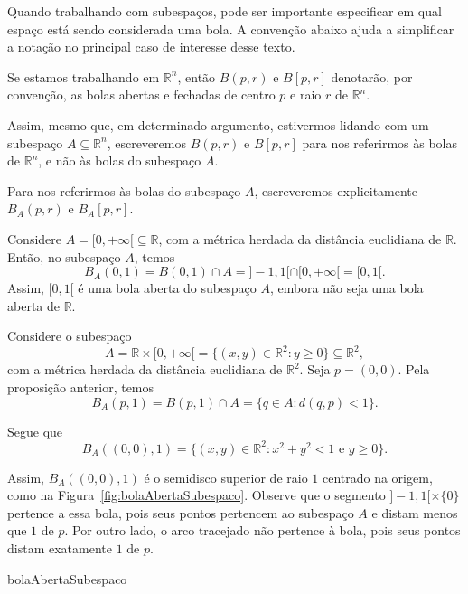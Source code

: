 Quando trabalhando com subespaços, pode ser importante especificar em qual espaço está sendo considerada uma bola.
A convenção abaixo ajuda a simplificar a notação no principal caso de interesse desse texto.

\begin{convention}
    Se estamos trabalhando em $\mathbb R^n$, então $B(p,r)$ e $B[p,r]$ denotarão, por convenção, as bolas abertas e fechadas de centro $p$ e raio $r$ de $\mathbb R^n$.

    Assim, mesmo que, em determinado argumento, estivermos lidando com um subespaço $A\subseteq \mathbb R^n$, escreveremos $B(p,r)$ e $B[p,r]$ para nos referirmos às bolas de $\mathbb R^n$, e não às bolas do subespaço $A$.

    Para nos referirmos às bolas do subespaço $A$, escreveremos explicitamente $B_A(p,r)$ e $B_A[p,r]$.
\end{convention}

\begin{example}
    Considere $A=[0,+\infty[\subseteq\mathbb R$, com a métrica herdada da distância euclidiana de $\mathbb R$.
    Então, no subespaço $A$, temos
    \[
        B_A(0,1)
        =
        B(0,1)\cap A
        =
        ]-1,1[\cap [0,+\infty[
        =
        [0,1[.
    \]
    Assim, $[0,1[$ é uma bola aberta do subespaço $A$, embora não seja uma bola aberta de $\mathbb R$.
\end{example}

\begin{example}
    Considere o subespaço
    \[
        A=\mathbb R\times [0,+\infty[=\{(x,y)\in\mathbb R^2:y\geq 0\}\subseteq\mathbb R^2,
    \]
    com a métrica herdada da distância euclidiana de $\mathbb R^2$.
    Seja $p=(0,0)$.
    Pela proposição anterior, temos
    \[
        B_A(p,1)=B(p,1)\cap A=\{q\in A: d(q, p)<1\}.
    \]

    Segue que
    \[
        B_A((0,0),1)
        =
        \{(x,y)\in\mathbb R^2:x^2+y^2<1 \text{ e } y\geq 0\}.
    \]
    
    Assim, $B_A((0,0),1)$ é o semidisco superior de raio $1$ centrado na origem, como na Figura~\ref{fig:bolaAbertaSubespaco}.
    Observe que o segmento $]-1,1[\times\{0\}$ pertence a essa bola, pois seus pontos pertencem ao subespaço $A$ e distam menos que $1$ de $p$.
    Por outro lado, o arco tracejado não pertence à bola, pois seus pontos distam exatamente $1$ de $p$.
\end{example}
{bolaAbertaSubespaco}

